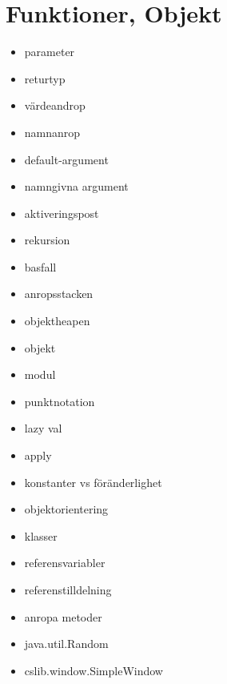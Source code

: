 \chapter{Funktioner, Objekt}\label{chapter:W03}
\begin{itemize}[nosep]
\item parameter
\item returtyp
\item värdeandrop
\item namnanrop
\item default-argument
\item namngivna argument
\item aktiveringspost
\item rekursion
\item basfall
\item anropsstacken
\item objektheapen
\item objekt
\item modul
\item punktnotation
\item lazy val
\item apply
\item konstanter vs föränderlighet
\item objektorientering
\item klasser
\item referensvariabler
\item referenstilldelning
\item anropa metoder
\item java.util.Random
\item cslib.window.SimpleWindow
\end{itemize}